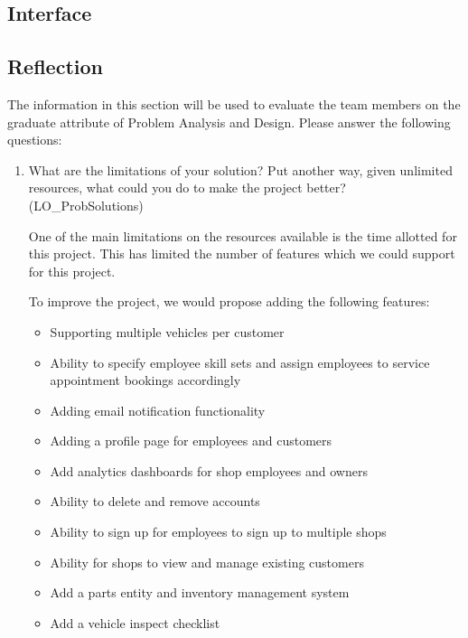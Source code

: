 \documentclass[12pt, titlepage]{article}
\begin{document}
\subsection{Interface}


\subsection{Reflection}

The information in this section will be used to evaluate the team members on the graduate attribute
of Problem Analysis and Design. Please answer the following questions:

\begin{enumerate}
	\item What are the limitations of your solution? Put another way, given unlimited resources, what could
	      you do to make the project better? (LO\_ProbSolutions)

	      One of the main limitations on the resources available is the time allotted for this project. This
	      has limited the number of features which we could support for this project.

	      To improve the project, we would propose adding the following features:
	      \begin{itemize}
		      \item Supporting multiple vehicles per customer
		      \item Ability to specify employee skill sets and assign employees to service appointment bookings
		            accordingly
		      \item Adding email notification functionality
		      \item Adding a profile page for employees and customers
		      \item Add analytics dashboards for shop employees and owners
		      \item Ability to delete and remove accounts
		      \item Ability to sign up for employees to sign up to multiple shops
		      \item Ability for shops to view and manage existing customers
		      \item Add a parts entity and inventory management system
		      \item Add a vehicle inspect checklist
	      \end{itemize}


\end{enumerate}
\end{document}
